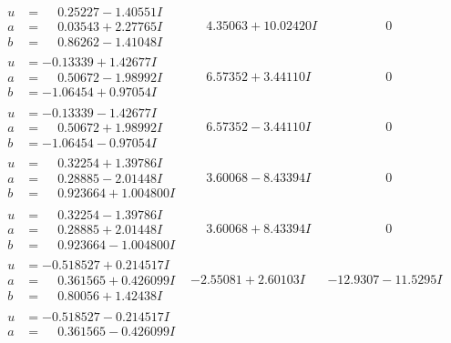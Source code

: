 \documentclass[1p]{elsarticle_modified}
\theoremstyle{definition}
\begin{document}
$$\begin{array}{c|c|c}
 \hline 
\begin{aligned}
u &= \phantom{-}0.25227 - 1.40551 I \\
a &= \phantom{-}0.03543 + 2.27765 I \\
b &= \phantom{-}0.86262 - 1.41048 I\end{aligned}
 & \phantom{-}4.35063 + 10.02420 I & \phantom{-0.000000 } 0 \\ \hline\begin{aligned}
u &= -0.13339 + 1.42677 I \\
a &= \phantom{-}0.50672 - 1.98992 I \\
b &= -1.06454 + 0.97054 I\end{aligned}
 & \phantom{-}6.57352 + 3.44110 I & \phantom{-0.000000 } 0 \\ \hline\begin{aligned}
u &= -0.13339 - 1.42677 I \\
a &= \phantom{-}0.50672 + 1.98992 I \\
b &= -1.06454 - 0.97054 I\end{aligned}
 & \phantom{-}6.57352 - 3.44110 I & \phantom{-0.000000 } 0 \\ \hline\begin{aligned}
u &= \phantom{-}0.32254 + 1.39786 I \\
a &= \phantom{-}0.28885 - 2.01448 I \\
b &= \phantom{-}0.923664 + 1.004800 I\end{aligned}
 & \phantom{-}3.60068 - 8.43394 I & \phantom{-0.000000 } 0 \\ \hline\begin{aligned}
u &= \phantom{-}0.32254 - 1.39786 I \\
a &= \phantom{-}0.28885 + 2.01448 I \\
b &= \phantom{-}0.923664 - 1.004800 I\end{aligned}
 & \phantom{-}3.60068 + 8.43394 I & \phantom{-0.000000 } 0 \\ \hline\begin{aligned}
u &= -0.518527 + 0.214517 I \\
a &= \phantom{-}0.361565 + 0.426099 I \\
b &= \phantom{-}0.80056 + 1.42438 I\end{aligned}
 & -2.55081 + 2.60103 I & -12.9307 - 11.5295 I \\ \hline\begin{aligned}
u &= -0.518527 - 0.214517 I \\
a &= \phantom{-}0.361565 - 0.426099 I \\

\end{aligned}
\end{array}$$
\end{document}
